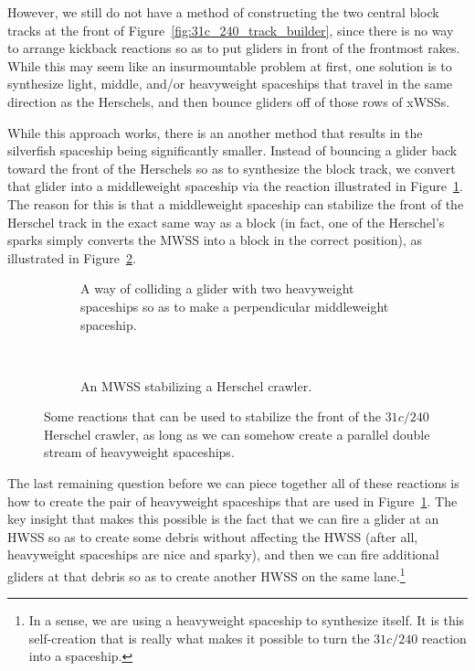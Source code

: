 However, we still do not have a method of constructing the two central block tracks at the front of Figure~\ref{fig:31c_240_track_builder}, since there is no way to arrange kickback reactions so as to put gliders in front of the frontmost rakes. While this may seem like an insurmountable problem at first, one solution is to synthesize light, middle, and/or heavyweight spaceships that travel in the same direction as the Herschels, and then bounce gliders off of those rows of xWSSs.

While this approach works, there is an another method that results in the silverfish spaceship being significantly smaller. Instead of bouncing a glider back toward the front of the Herschels so as to synthesize the block track, we convert that glider into a middleweight spaceship via the reaction illustrated in Figure~\ref{fig:g_2h_to_m}. The reason for this is that a middleweight spaceship can stabilize the front of the Herschel track in the exact same way as a block (in fact, one of the Herschel's sparks simply converts the MWSS into a block in the correct position), as illustrated in Figure~\ref{fig:herschel_mwss_stabilize}.

\begin{figure}[!htb]
	\centering
	\begin{subfigure}[b]{0.43\textwidth}
		\centering
		\caption{A way of colliding a glider with two heavyweight spaceships so as to make a perpendicular middleweight spaceship.}\label{fig:g_2h_to_m}
	\end{subfigure} \ \	\ \ \ \begin{subfigure}[b]{0.53\textwidth}
		\centering
		\caption{An MWSS stabilizing a Herschel crawler.}\label{fig:herschel_mwss_stabilize}
	\end{subfigure}
	\caption{Some reactions that can be used to stabilize the front of the $31c/240$ Herschel crawler, as long as we can somehow create a parallel double stream of heavyweight spaceships.}\label{fig:silverfish_mwss_reactions}
\end{figure}

The last remaining question before we can piece together all of these reactions is how to create the pair of heavyweight spaceships that are used in Figure~\ref{fig:g_2h_to_m}. The key insight that makes this possible is the fact that we can fire a glider at an HWSS so as to create some debris without affecting the HWSS (after all, heavyweight spaceships are nice and sparky), and then we can fire additional gliders at that debris so as to create another HWSS on the same lane.\footnote{In a sense, we are using a heavyweight spaceship to synthesize itself. It is this self-creation that is really what makes it possible to turn the $31c/240$ reaction into a spaceship.}

